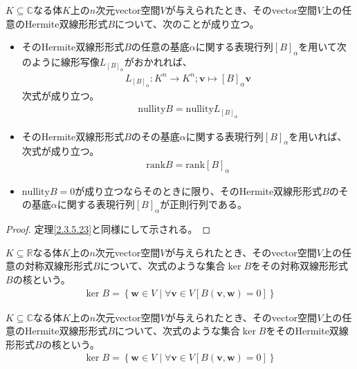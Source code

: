\documentclass[dvipdfmx]{jsarticle}
\begin{document}
\begin{thm}\label{2.3.5.24}
$K \subseteq \mathbb{C}$なる体$K$上の$n$次元vector空間$V$が与えられたとき、そのvector空間$V$上の任意のHermite双線形形式$B$について、次のことが成り立つ。
\begin{itemize}
\item
  そのHermite双線形形式$B$の任意の基底$\alpha$に関する表現行列$[ B]_{\alpha}$を用いて次のように線形写像$L_{[ B]_{\alpha}}$がおかれれば、
\begin{align*}
L_{[ B]_{\alpha}}:K^{n} \rightarrow K^{n};\mathbf{v} \mapsto [ B]_{\alpha}\mathbf{v}
\end{align*}
次式が成り立つ。
\begin{align*}
{\mathrm{nullity}}B = {\mathrm{nullity}}L_{[ B]_{\alpha}}
\end{align*}
\item
  そのHermite双線形形式$B$のその基底$\alpha$に関する表現行列$[ B]_{\alpha}$を用いれば、次式が成り立つ。
\begin{align*}
{\mathrm{rank}}B = {\mathrm{rank}}[ B]_{\alpha}
\end{align*}
\item
  ${\mathrm{nullity}}B = 0$が成り立つならそのときに限り、そのHermite双線形形式$B$のその基底$\alpha$に関する表現行列$[ B]_{\alpha}$が正則行列である。
\end{itemize}
\end{thm}
\begin{proof} 定理\ref{2.3.5.23}と同様にして示される。
\end{proof}
\begin{dfn}
$K \subseteq \mathbb{R}$なる体$K$上の$n$次元vector空間$V$が与えられたとき、そのvector空間$V$上の任意の対称双線形形式$B$について、次式のような集合$\ker B$をその対称双線形形式$B$の核という。
\begin{align*}
\ker B = \left\{ \mathbf{w} \in V \middle| \forall\mathbf{v} \in V\left[ B\left( \mathbf{v},\mathbf{w} \right) = 0 \right] \right\}
\end{align*}
\end{dfn}
\begin{dfn}
$K \subseteq \mathbb{C}$なる体$K$上の$n$次元vector空間$V$が与えられたとき、そのvector空間$V$上の任意のHermite双線形形式$B$について、次式のような集合$\ker B$をそのHermite双線形形式$B$の核という。
\begin{align*}
\ker B = \left\{ \mathbf{w} \in V \middle| \forall\mathbf{v} \in V\left[ B\left( \mathbf{v},\mathbf{w} \right) = 0 \right] \right\}
\end{align*}
\end{dfn}
\end{document}

